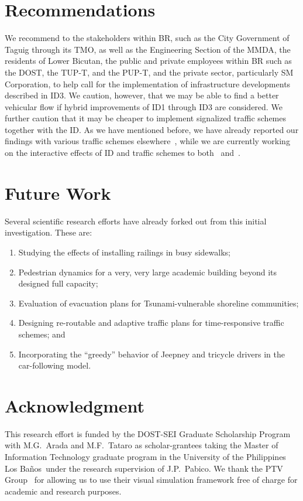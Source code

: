\documentclass[preprint]{./acm_proc_article-sp}
\newcommand{\UPLB}{University of the Philippines Los Ba\~{n}os}
\begin{document}
\section{Recommendations}\label{sec:recommend}
We recommend to the stakeholders within BR, such as the City Government of Taguig through its TMO, as well as the Engineering Section of the MMDA, the residents of Lower Bicutan, the public and private employees within BR such as the DOST, the TUP-T, and the PUP-T, and the private sector, particularly SM Corporation, to help call for the implementation of infrastructure developments described in ID3. We caution, however, that we may be able to find a better vehicular flow if hybrid improvements of ID1 through ID3 are considered. We further caution that it may be cheaper to implement signalized traffic schemes together with the ID. As we have mentioned before, we have already reported our findings with various traffic schemes elsewhere~\cite{tataro13}, while we are currently working~\cite{arada14} on the interactive effects of ID and traffic schemes to both~ and~.

\section{Future Work}
Several scientific research efforts have already forked out from this initial investigation. These are:
\begin{enumerate}
\item Studying the effects of installing railings in busy sidewalks;
\item Pedestrian dynamics for a very, very large academic building beyond its designed full capacity;
\item Evaluation of evacuation plans for Tsunami-vulnerable shoreline communities;
\item Designing re-routable and adaptive traffic plans for time-responsive traffic schemes; and
\item Incorporating the ``greedy'' behavior of Jeepney and tricycle drivers in the car-following model.
\end{enumerate}

\section{Acknowledgment}

This research effort is funded by the DOST-SEI Graduate Scholarship Program with M.G.~Arada and M.F.~Tataro as scholar-grantees taking the Master of Information Technology graduate program in the \UPLB\ under the research supervision of J.P.~Pabico. We thank the PTV Group~\citep{PTV} for allowing us to use their visual simulation framework free of charge for academic and research purposes. 
\end{document}
